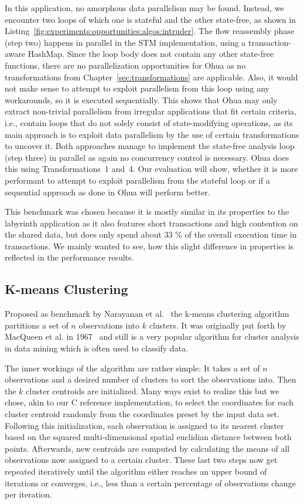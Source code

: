 In this application, no amorphous data parallelism may be found.
Instead, we encounter two loops of which one is stateful and the other state-free, as shown in Listing~\ref{fig:experiments:opportunities:algos:intruder}.
The flow reassembly phase (step two) happens in parallel in the STM implementation, using a transaction-aware HashMap.
Since the loop body does not contain any other state-free functions, there are no parallelization opportunities for Ohua as no transformations from Chapter~\ref{sec:transformations} are applicable.
Also, it would not make sense to attempt to exploit parallelism from this loop using any workarounds, so it is executed sequentially.
This shows that Ohua may only extract non-trivial parallelism from irregular applications that fit certain criteria, i.e., contain loops that do not solely consist of state-modifying operations, as its main approach is to exploit data parallelism by the use of certain transformations to uncover it.
Both approaches manage to implement the state-free analysis loop (step three) in parallel as again no concurrency control is necessary.
Ohua does this using Transformations~1 and~4.
Our evaluation will show, whether it is more performant to attempt to exploit parallelism from the stateful loop or if a sequential approach as done in Ohua will perform better.

This benchmark was chosen because it is mostly similar in its properties to the labyrinth application as it also features short transactions and high contention on the shared data, but does only spend about 33 \% of the overall execution time in transactions.
We mainly wanted to see, how this slight difference in properties is reflected in the performance results.


\subsection{K-means Clustering}
\label{sec:experiments:kmeans}

Proposed as benchmark by Narayanan et al.~\cite{narayanan2006minebench} the k-means clustering algorithm partitions a set of $n$ observations into $k$ clusters.
It was originally put forth by MacQueen et al. in 1967~\cite{macqueen1967some} and still is a very popular algorithm for cluster analysis in data mining which is often used to classify data.

The inner workings of the algorithm are rather simple: It takes a set of $n$ observations and a desired number of clusters to sort the observations into.
Then the $k$ cluster centroids are initialized.
Many ways exist to realize this but we chose, akin to our C reference implementation, to select the coordinates for each cluster centroid randomly from the coordinates preset by the input data set.
Following this initialization, each observation is assigned to its nearest cluster based on the squared multi-dimensional spatial euclidian distance between both points.
Afterwards, new centroids are computed by calculating the means of all observations now assigned to a certain cluster.
These last two steps now get repeated iteratively until the algorithm either reaches an upper bound of iterations or converges, i.e., less than a certain percentage of observations change per iteration.

